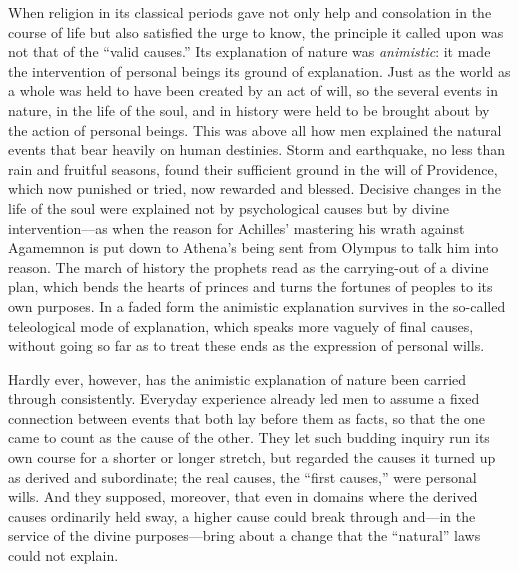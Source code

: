 \documentclass[12pt,a4paper]{article}
\newcommand{\opage}[1]{\marginnote{\footnotesize\textit{[#1]}}}
\begin{document}
When religion in its classical periods gave not only help and consolation in the
course of life but also satisfied the urge to know, the principle it called upon was
not that of the ``valid causes.'' Its explanation of nature was \emph{animistic}: it
made the intervention of personal beings its ground of explanation. Just as the
world as a whole was held to have been created by an act of will, so the several
events in nature, in the life of the soul, and in history were held to be brought
about by the action of personal beings. This was above all how men explained the
natural events that bear heavily on human destinies. Storm and earthquake, no less
than rain and fruitful seasons, found their sufficient ground in the will of
Providence, which now punished or tried, now rewarded and blessed. Decisive changes
in the life of the soul were explained not by psychological causes but by divine
intervention---as when the reason for Achilles' mastering his wrath against
Agamemnon is put down to Athena's being sent from Olympus to talk him into reason.
The march of history the prophets read as the carrying-out of a divine plan, which
bends the hearts of princes and turns the fortunes of peoples to its own purposes.
In a faded form the animistic explanation survives in the so-called teleological
mode of explanation, which speaks more vaguely of final causes, without going so far
as to treat these ends as the expression of personal wills.

Hardly ever, however, has the animistic explanation of nature been carried through
consistently. Everyday experience already led men to assume a fixed connection
between events that both lay before them as facts, so that the one came to count as
the cause of the other. They let such budding inquiry run its own course for a
shorter or longer stretch, but \opage{21}regarded the causes it turned up as derived and
subordinate; the real causes, the ``first causes,'' were personal wills. And they
supposed, moreover, that even in domains where the derived causes ordinarily held
sway, a higher cause could break through and---in the service of the divine
purposes---bring about a change that the ``natural'' laws could not explain.
\end{document}
